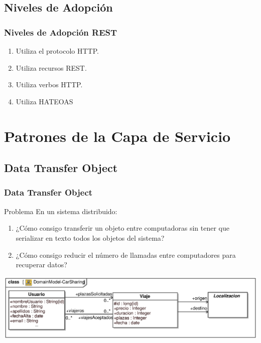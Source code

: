 \documentclass[handout,a4paper,slidestop,xcolor=pst,blue]{beamer}
\begin{document}
\subsection{Niveles de Adopción}

\begin{frame}[c]
    \frametitle{Niveles de Adopción REST}
    \begin{enumerate}[<+->]
        \item Utiliza el protocolo HTTP.
        \item Utiliza recursos REST.
        \item Utiliza verbos HTTP.
        \item Utiliza HATEOAS
    \end{enumerate}
\end{frame}

\section{Patrones de la Capa de Servicio}

\subsection{Data Transfer Object}

\begin{frame}[c]
    \frametitle{Data Transfer Object}
    \begin{block}{Problema}
        En un sistema distribuido:
        \begin{enumerate}
            \item<2-> ¿Cómo consigo transferir un objeto entre computadoras sin tener que serializar en texto todos los objetos del sistema?
            \item<3-> ¿Cómo consigo reducir el número de llamadas entre computadores para recuperar datos?
        \end{enumerate}
    \end{block}
    \begin{center}
        \includegraphics[width=\linewidth]{images/patterns/dto00.eps}
    \end{center}
\end{frame}
\end{document}
